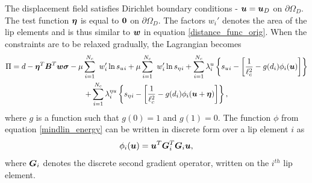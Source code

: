 \documentclass[10pt]{cas-sc}
\newcommand{\added}[1]{#1}
\begin{document}
The displacement field satisfies Dirichlet boundary conditions - $\mbox{\boldmath $u$} = \mbox{\boldmath $u$}_D$ on $\partial \Omega_D$. The test function $\mbox{\boldmath $\eta$}$ is equal to $\bf0$ on $\partial \Omega_D$. The factors $ w_i'$ denotes the area of the \added{lip} elements and is thus similar to $ \mbox{\boldmath $w$}$ in equation \eqref{distance_func_orig}. When the constraints are to be relaxed gradually, the Lagrangian becomes
\begin{multline}
	\Pi  = d -\mbox{\boldmath $\eta$} ^T \mbox{\boldmath $B$}^T \mbox{\boldmath $w$} \mbox{\boldmath $\sigma$} - \mu \sum_{i=1}^{N_c} \
	w_i' \ln s_u{_i} + \mu \sum_{i=1}^{N_c} \
	w_i' \ln s_\eta{_i} +\sum_{i=1}^{N_c} \lambda^u_i \left\{ s_u{_i}  - \left[ \frac{1}{\ell_c ^2}- g(d_i)\phi_i(\mbox{\boldmath $u$}) \right]  \right\} \\
	+\sum_{i=1}^{N_c} \lambda^{\eta u}_ i \left\{ s_\eta{_i}  - \left[ \frac{1}{\ell_c ^2}-g(d_i) \phi_i(\mbox{\boldmath $u$}+\mbox{\boldmath $\eta$}) \right]  \right\}, \label{lagrangian_interior_point}
\end{multline}
where $g$ is a function such that $g(0)=1$ and $g(1)=0$. The function $\phi$ from equation \eqref{mindlin_energy} can be written in discrete form over a \added{lip} element $i$ as
\begin{equation}
	\phi_i(\mbox{\boldmath $u$} ) = \mbox{\boldmath $u$} ^T \mbox{\boldmath $G$}_i ^T \mbox{\boldmath $G$}_i \mbox{\boldmath $u$},
\end{equation}
where $\mbox{\boldmath $G$}_i$ denotes the discrete second gradient operator, written on the $i^{th}$ \added{lip} element. 
\end{document}

